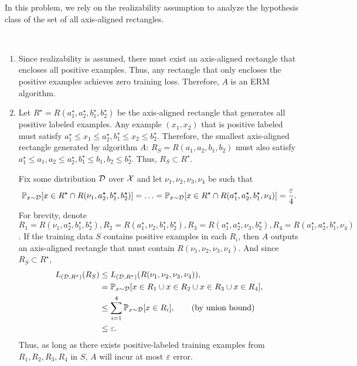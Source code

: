 \begin{problem}{3}
    In this problem, we rely on the realizability assumption to analyze the hypothesis class of the set of all axis-aligned rectangles.
\end{problem}
\begin{solution} \
    \begin{enumerate}[label=(\alph*)]
        \item Since realizability is assumed, there must exist an axis-aligned rectangle that encloses all positive examples. Thus, any rectangle that only encloses the positive examples achieves zero training loss. Therefore, $A$ is an ERM algorithm.
        
        \item Let $R^\star = R(a_1^\star, a_2^\star, b_1^\star, b_2^\star)$ be the axis-aligned rectangle that generates all positive labeled examples. Any example $(x_1,x_2)$ that is positive labeled must satisfy $a_1^\star \leq x_1 \leq a_2^\star, b_1^\star \leq x_2 \leq b_2^\star$. Therefore, the smallest axis-aligned rectangle generated by algorithm $A$: $R_S = R(a_1, a_2, b_1, b_2)$ must also satisfy $a_1^\star \leq a_1, a_2 \leq a_2^\star, b_1^\star \leq b_1, b_2 \leq b_2^\star$. Thus, $R_S \subset R^\star$.

        Fix some distribution $\mathcal{D}$ over $\mathcal{X}$ and let $\nu_1, \nu_2, \nu_3, \nu_4$ be such that
        \[\mathbb{P}_{x \sim \mathcal{D}}[x \in R^\star \cap R(\nu_1, a_2^\star, b_1^\star, b_2^\star)] = \ldots = \mathbb{P}_{x\sim\mathcal{D}}[x \in R^\star \cap R(a_1^\star, a_2^\star, b_1^\star, \nu_4)] = \frac{\varepsilon}{4}.\]
        For brevity, denote $R_1 = R(\nu_1, a_2^\star, b_1^\star, b_2^\star), R_2 = R(a_1^\star, \nu_2, b_1^\star, b_2^\star), R_3 = R(a_1^\star, a_2^\star, \nu_3, b_2^\star), R_4 = R(a_1^\star, a_2^\star, b_1^\star, \nu_4)$. If the training data $S$ contains positive examples in each $R_i$, then $A$ outputs an axis-aligned rectangle that must contain $R(\nu_1, \nu_2, \nu_3,\nu_4)$. And since $R_S \subset R^\star$, 
        \begin{align*}
            L_{(\mathcal{D}, R^\star)}(R_S) &\leq L_{(\mathcal{D}, R^\star)}(R(\nu_1,\nu_2,\nu_3,\nu_4)), \\
            &= \mathbb{P}_{x \sim \mathcal{D}}[x \in R_1 \cup x \in R_2 \cup x \in R_3 \cup x \in R_4], \\
            &\leq \sum_{i=1}^4\mathbb{P}_{x \sim \mathcal{D}}[x \in R_i], \tag{by union bound} \\
            &\leq \varepsilon.
        \end{align*}
        Thus, as long as there exists positive-labeled training examples from $R_1,R_2,R_3,R_4$ in $S$, $A$ will incur at most $\varepsilon$ error.
        

\end{enumerate}
\end{solution}
